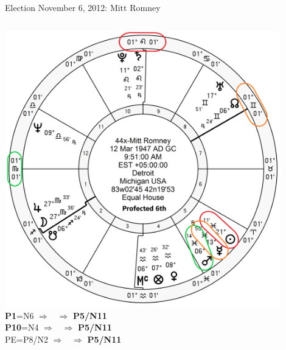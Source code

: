 \begin{frame}[t]{Election November 6, 2012: Mitt Romney}
\begin{columns}[T, onlytextwidth]
\vspace{-1em}
{\includegraphics[width=0.9\textwidth]{charts/Romney-Prof-6th.png}}
\fontsize{8pt}{9pt}\selectfont
\textbf{\dgreen P1}=N6
	$\Rightarrow$ \Mars\, $\Rightarrow$ \textbf{\dgreen P5/N11}\\
\textbf{\red P10}=N4
	$\Rightarrow$ \Sun\, $\Rightarrow$ \textbf{\dgreen P5/N11}\\
PE=P8/N2
	 $\Rightarrow$ \Mercury\, $\Rightarrow$ \textbf{\dgreen P5/N11}

\end{columns}
\end{frame}
